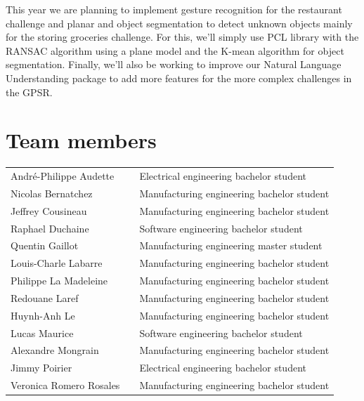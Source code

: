 \documentclass[runningheads,a4paper]{llncs}
\begin{document}
This year we are planning to implement gesture recognition for the restaurant challenge and planar and object segmentation to detect unknown objects mainly for the storing groceries challenge. For this, we'll simply use PCL library with the RANSAC algorithm using a plane model and the K-mean algorithm for object segmentation. Finally, we'll also be working to improve our Natural Language Understanding package to add more features for the more complex challenges in the GPSR.\\ 






	
\section*{Team members}

\begin{tabular}{lll}
   
André-Philippe Audette &    & 	Electrical engineering bachelor student \\
Nicolas Bernatchez &    & 		Manufacturing engineering bachelor student \\
Jeffrey Cousineau &    & 		Manufacturing engineering bachelor student \\
Raphael Duchaine &    & 		Software engineering bachelor student \\
Quentin Gaillot &    & 			Manufacturing engineering master student \\
Louis-Charle Labarre &    & 	Manufacturing engineering bachelor student \\ 
Philippe La Madeleine &    & 	Manufacturing engineering bachelor student \\ 
Redouane Laref &    & 			Manufacturing engineering bachelor student \\
Huynh-Anh Le &    & 			Manufacturing engineering bachelor student \\
Lucas Maurice &    & 			Software engineering bachelor student \\
Alexandre Mongrain  &    & 		Manufacturing engineering bachelor student \\
Jimmy Poirier &    & 			Electrical engineering bachelor student \\
Veronica Romero Rosales  &   & Manufacturing engineering bachelor student \\

\end{tabular}
\end{document}
